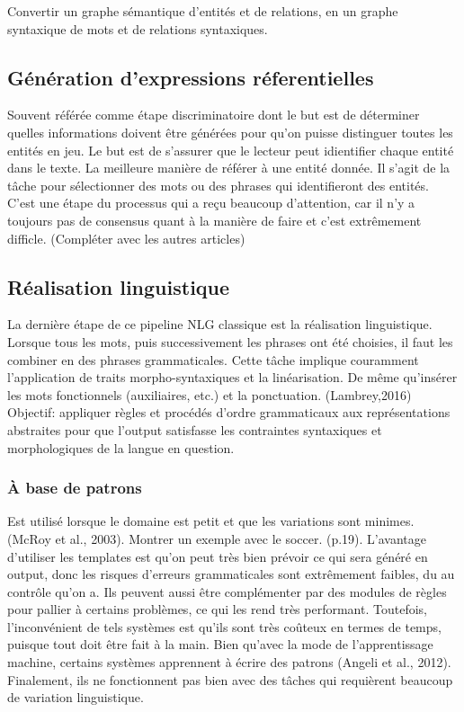 Convertir un graphe sémantique d'entités et de relations, en un graphe syntaxique de mots et de relations syntaxiques. 

\subsection{Génération d'expressions réferentielles}
Souvent référée comme étape discriminatoire dont le but est de déterminer quelles informations doivent être générées pour qu'on puisse distinguer toutes les entités en jeu. Le but est de s'assurer que le lecteur peut idientifier chaque entité dans le texte. La meilleure manière de référer à une entité donnée.
Il s'agit de la tâche pour sélectionner des mots ou des phrases qui identifieront des entités. C'est une étape du processus qui a reçu beaucoup d'attention, car il n'y a toujours pas de consensus quant à la manière de faire et c'est extrêmement difficle. (Compléter avec les autres articles)

\subsection{Réalisation linguistique}
La dernière étape de ce pipeline NLG classique est la réalisation linguistique. Lorsque tous les mots, puis successivement les phrases ont été choisies, il faut les combiner en des phrases grammaticales. Cette tâche implique couramment l'application de traits morpho-syntaxiques et la linéarisation. De même qu'insérer les mots fonctionnels (auxiliaires, etc.) et la ponctuation. (Lambrey,2016) Objectif: appliquer règles et procédés d'ordre grammaticaux aux représentations abstraites pour que l'output satisfasse les contraintes syntaxiques et morphologiques de la langue en question.

\subsubsection{À base de patrons}
Est utilisé lorsque le domaine est petit et que les variations sont minimes. (McRoy et al., 2003). Montrer un exemple avec le soccer. (p.19).  L'avantage d'utiliser les templates est qu'on peut très bien prévoir ce qui sera généré en output, donc les risques d'erreurs grammaticales sont extrêmement faibles, du au contrôle qu'on a. Ils peuvent aussi être complémenter par des modules de règles pour pallier à certains problèmes, ce qui les rend très performant. Toutefois, l'inconvénient de tels systèmes est qu'ils sont très coûteux en termes de temps, puisque tout doit être fait à la main. Bien qu'avec la mode de l'apprentissage machine, certains systèmes apprennent à écrire des patrons (Angeli et al., 2012). Finalement, ils ne fonctionnent pas bien avec des tâches qui requièrent beaucoup de variation linguistique.

